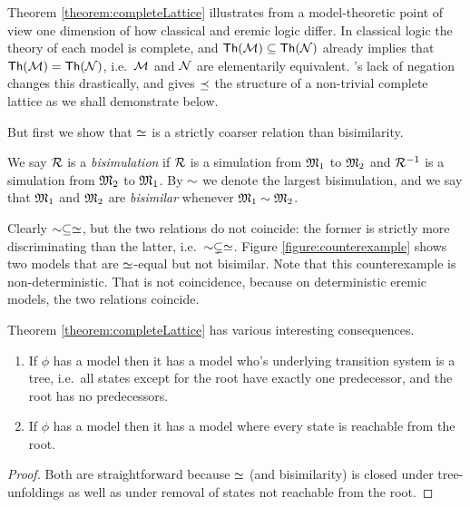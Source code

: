 Theorem \ref{theorem:completeLattice} illustrates from a
model-theoretic point of view one dimension of how classical and
eremic logic differ. In classical logic the theory of each model is
complete, and $\mathsf{Th}(\mathcal{M}) \subseteq \mathsf{Th}(\mathcal{N})$ already
implies that $\mathsf{Th}(\mathcal{M}) = \mathsf{Th}(\mathcal{N})$, i.e.~$\mathcal{M}$ and
$\mathcal{N}$ are elementarily equivalent. \ELFULL{}'s lack of negation
changes this drastically, and gives $\preceq$ the structure of a
non-trivial complete lattice as we shall demonstrate below.

But first we show that $\simeq$ is a strictly coarser relation than 
bisimilarity.

\begin{definition}
We say $\mathcal{R}$ is a \emph{bisimulation} if $\mathcal{R}$ is a simulation from
$\frak{M}_1$ to $\frak{M}_2$ and $\mathcal{R}^{-1}$ is a simulation from $\frak{M}_2$ to
$\frak{M}_1$. By $\sim$ we denote the largest bisimulation, and we say
that $\frak{M}_1$ and $\frak{M}_2$ are \emph{bisimilar} whenever $\frak{M}_1
\sim \frak{M}_2$.
\end{definition}

Clearly $\sim \subseteq \simeq$, but the two relations do not
coincide: the former is strictly more discriminating than the latter,
i.e.~$\sim \subsetneq \simeq$. Figure \ref{figure:counterexample}
shows two models that are $\simeq$-equal but not bisimilar. Note
that this counterexample is non-deterministic. That is not
coincidence, because on deterministic eremic models, the two relations
coincide.



Theorem \ref{theorem:completeLattice} has various interesting
consequences.

\begin{corollary}
\begin{enumerate}

\item If $\phi$ has a model then it has a model who's underlying
  transition system is a tree, i.e.~all states except for the root
  have exactly one predecessor, and the root has no predecessors.

\item If $\phi$ has a model then it has a model where every state is
  reachable from the root.

\end{enumerate}
\end{corollary}
\begin{proof}
Both are straightforward because $\simeq$ (and bisimilarity) is
closed under tree-unfoldings as well as under removal of states not
reachable from the root.
\end{proof}



